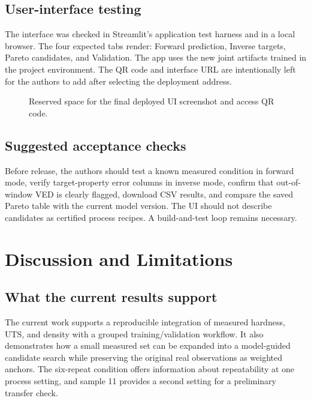 \documentclass[12pt,a4paper,oneside]{report}
\begin{document}
\section{User-interface testing}
The interface was checked in Streamlit's application test harness and in a local browser. The four expected tabs render: Forward prediction, Inverse targets, Pareto candidates, and Validation. The app uses the new joint artifacts trained in the project environment. The QR code and interface URL are intentionally left for the authors to add after selecting the deployment address.

\begin{figure}[H]
\centering
{}
\caption{Reserved space for the final deployed UI screenshot and access QR code.}
\label{fig:ui-placeholder}
\end{figure}

\section{Suggested acceptance checks}
Before release, the authors should test a known measured condition in forward mode, verify target-property error columns in inverse mode, confirm that out-of-window VED is clearly flagged, download CSV results, and compare the saved Pareto table with the current model version. The UI should not describe candidates as certified process recipes. A build-and-test loop remains necessary.

\chapter{Discussion and Limitations}

\section{What the current results support}
The current work supports a reproducible integration of measured hardness, UTS, and density with a grouped training/validation workflow. It also demonstrates how a small measured set can be expanded into a model-guided candidate search while preserving the original real observations as weighted anchors. The six-repeat condition offers information about repeatability at one process setting, and sample 11 provides a second setting for a preliminary transfer check.
\end{document}
